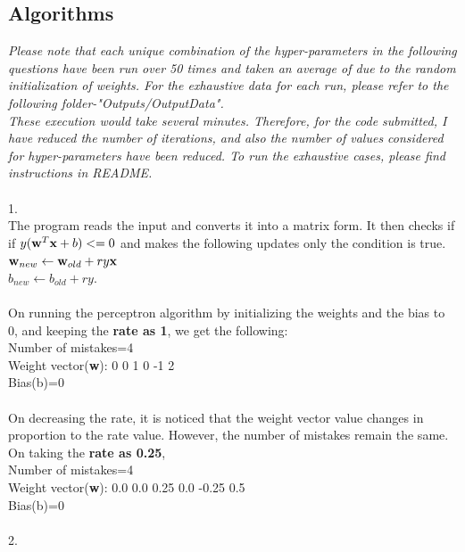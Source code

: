 \documentclass[12pt, fullpage,letterpaper]{article}
\newcommand{\bw}{{\bf w}}
\newcommand{\bx}{{\bf x}}
\begin{document}
\subsection{Algorithms}
\emph{Please note that each unique combination of the hyper-parameters in the following questions have been run over 50 times and taken an average of due to the random initialization of weights. For the exhaustive data for each run, please refer to the following folder-"Outputs/OutputData".\\
These execution would take several minutes. Therefore, for the code submitted, I have reduced the number of iterations, and also the number of values considered for hyper-parameters have been reduced. To run the exhaustive cases, please find instructions in README.}\\\\
1. \\
The program reads the input and converts it into a matrix form.
It then checks if  if $y (\bw^T\bx + b) <= 0$ and makes the following updates only the condition is true.\\
$\bw_{new} \leftarrow \bw_{old} + r y \bx$\\
$b_{new} \leftarrow b_{old} + r y$.\\\\
On running the perceptron algorithm by initializing the weights and  the bias to 0, and keeping the \textbf{rate as 1}, we get the following:\\
Number of mistakes=4\\
Weight vector(\textbf{w}): 0  0  1  0  -1  2\\
Bias(b)=0\\\\
On decreasing the rate, it is noticed that the weight vector value changes in proportion to the rate value. However, the number of mistakes remain the same.\\
On taking the \textbf{rate as 0.25},\\
Number of mistakes=4\\
Weight vector(\textbf{w}): 0.0  \hspace{5pt} 0.0  \hspace{5pt}0.25 \hspace{5pt} 0.0 \hspace{5pt}-0.25 \hspace{5pt}	0.5\\
Bias(b)=0\\\\
2.\\
\end{document}
